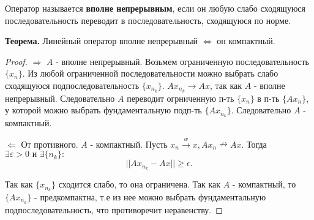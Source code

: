 Оператор называется \textbf{вполне непрерывным}, если он любую слабо сходящуюся последовательность переводит в последовательность, сходящуюся по норме.
\bigbreak

\textbf{Теорема.} Линейный оператор вполне непрерывный $\Leftrightarrow$ он
компактный.
\begin{proof}
    $\Rightarrow$ $A$ - вполне непрерывный. Возьмем ограниченную последовательность $\{x_n\}$. Из любой ограниченной последовательности можно выбрать
слабо сходящуюся подпоследовательность $\{x_{n_k}\}$. $Ax_{n_k} \rightarrow Ax$, так как $A$ - вполне непрерывный. Следовательно $A$ переводит огрниченную п-ть $\{x_n\}$ в п-ть $\{Ax_n\}$, у которой можно выбрать фундаментальную подп-ть  $\{Ax_{n_k}\}$. Следовательно $A$ - компактный.

    $\Leftarrow$ От противного. $A$ - компактный. Пусть $x_n \xrightarrow{w} x, Ax_n \nrightarrow  Ax$. Тогда $\exists \varepsilon > 0 \text{ и } \exists \{n_k\}:$
    $$
        ||Ax_{n_k} - Ax|| \ge \epsilon.
    $$

    Так как $\{x_{n_k}\}$ сходится слабо, то она ограничена. Так как $A$ - компактный, то $\{Ax_{n_k}\}$ - предкомпактна, т.е из нее можно выбрать фундаментальную подпоследовательность, что противоречит неравенству.
\end{proof}

